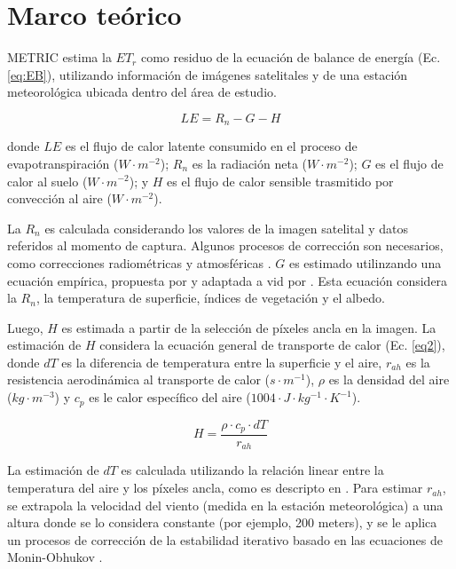 \documentclass[]{article}
\begin{document}



\section{Marco teórico}

METRIC estima la $ET_r$ como residuo de la ecuación de balance de energía (Ec. \ref{eq:EB}), utilizando información de imágenes satelitales y de una estación meteorológica ubicada dentro del área de estudio. 

\begin{equation}
\label{eq:EB}
LE = R_n - G - H
\end{equation}

donde $LE$ es el flujo de calor latente consumido en el proceso de evapotranspiración ($W \cdot m^{-2}$); $R_n$ es la radiación neta ($W \cdot m^{-2}$); $G$ es el flujo de calor al suelo ($W \cdot m^{-2}$); y $H$ es el flujo de calor sensible trasmitido por convección al aire ($W \cdot m^{-2}$).

La $R_n$ es calculada considerando los valores de la imagen satelital y datos referidos al momento de captura. Algunos procesos de corrección son necesarios, como correcciones radiométricas y atmosféricas \citep{Tasumi2008a}. $G$ es estimado utilinzando una ecuación empírica, propuesta por \cite{Allen2007a} y adaptada a vid por \cite{Carrasco-Benavides2014}. Esta ecuación considera la $R_n$, la temperatura de superficie, índices de vegetación y el albedo. 

Luego, $H$ es estimada a partir de la selección de píxeles ancla en la imagen. La estimación de $H$ considera la ecuación general de transporte de calor (Ec. \ref{eq2}), donde $dT$ es  la diferencia de temperatura entre la superficie y el aire, $r_{ah}$ es la resistencia aerodinámica al transporte de calor ($s \cdot m^{-1}$), $\rho$ es la densidad del aire ($kg \cdot m^{-3}$) y $c_{p}$ es le calor específico del aire ($1004\cdot J \cdot kg^{-1} \cdot K^{-1}$). 

\begin{equation}
\label{eq2}
H=\frac{\rho \cdot c_{p} \cdot dT}{r_{ah}} 
\end{equation}

La estimación de $dT$ es calculada utilizando la relación linear entre la temperatura del aire y  los píxeles ancla, como es descripto en  \citep{Bastiaanssen1998a}. Para estimar $r_{ah}$, se extrapola la velocidad del viento (medida en la estación meteorológica) a una altura donde se lo considera constante (por ejemplo, 200 meters), y se le aplica un procesos de corrección de la estabilidad iterativo basado en las ecuaciones de Monin-Obhukov \citep{Allen1996}.
\end{document}
